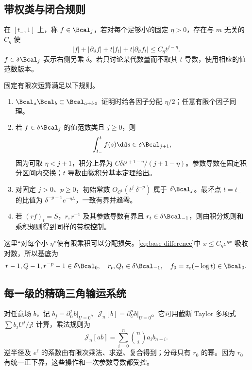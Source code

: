\subsection{带权类与闭合规则}
\begin{definition}[有限阶带权控制]
在 $[t_-,1]$ 上，称 $f\in\Bcal_j$，若对每个足够小的固定 $\eta>0$，存在与 $m$ 无关的 $C_\eta$ 使
\begin{equation}\label{eq:weighted-class}
|f|+|\partial_\vartheta f|+t|f_t|+t|\partial_\vartheta f_t|
\le C_\eta t^{j-\eta}.
\end{equation}
$f\in\delta\Bcal_j$ 表示右侧另乘 $\delta$。若只讨论某代数量而不取其 $t$ 导数，使用相应的值范数版本。
\end{definition}

固定有限次运算满足以下规则。
\begin{enumerate}
\item $\Bcal_a\Bcal_b\subset\Bcal_{a+b}$。证明时给各因子分配 $\eta/2$；任意有限个因子同理。
\item 若 $f\in\delta\Bcal_j$ 的值范数类且 $j\ge0$，则
\[
\int_{t_-}^tf(s)\dd s\in\delta\Bcal_{j+1},
\]
因为可取 $\eta<j+1$，积分上界为 $C\delta t^{j+1-\eta}/(j+1-\eta)$。参数导数在固定积分区间内交换；$t$ 导数由微积分基本定理给出。
\item 对固定 $j>0$、$p\ge0$，初始常数 $O_{C^1}(t_-^j\delta^{-p})$ 属于 $\delta\Bcal_j$。最坏点 $t=t_-$ 的比值为 $\delta^{-p-1}e^{-\eta L}$，一致有界并趋零。
\item 若 $(rf)_t=S$，$r,r^{-1}$ 及其参数导数有界且 $r_t\in\delta\Bcal_{-1}$，则由积分规则和乘积规则得到同样的带权控制。
\end{enumerate}
这里“对每个小 $\eta$”使有限乘积可以分配损失。\eqref{eq:base-difference}中 $x\le C_\eta e^{\eta x}$ 吸收对数，所以基底为
\begin{equation}\label{eq:base-B}
r-1,Q-1,r^{-p}-1\in\delta\Bcal_0,\quad
r_t,Q_t\in\delta\Bcal_{-1},\quad f_0=z_c(-\log t)\in\Bcal_0.
\end{equation}

\subsection{每一级的精确三角输运系统}
对任意场 $b$，记 $b_j=\partial_U^jb|_{U=0}$、$\mathcal J_n[b]=\partial_U^nb|_{U=0}$。它可用截断 Taylor 多项式 $\sum b_jU^j/j!$ 计算，乘法规则为
\begin{equation}\label{eq:jetproduct}
\mathcal J_n[ab]=\sum_{i=0}^n\binom ni a_i b_{n-i}.
\end{equation}
逆半径及 $e^\ell$ 的系数由有限次乘法、求逆、复合得到；分母只有 $r_0$ 的幂。因为 $r_0$ 有统一正下界，这些操作和一次参数导数都受控。

